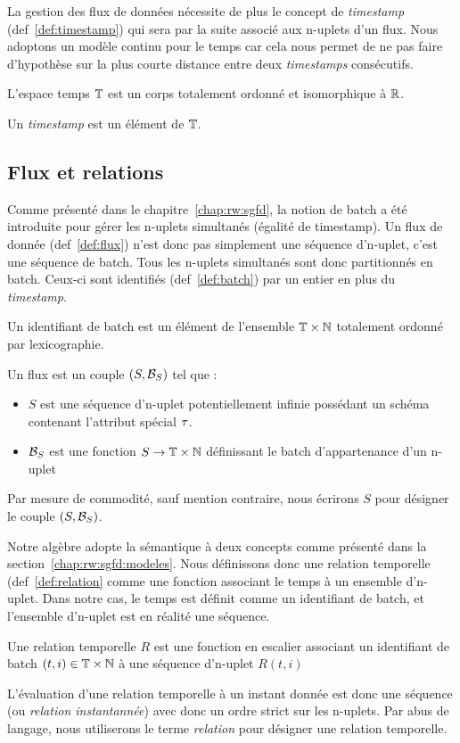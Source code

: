 La gestion des flux de données nécessite de plus le concept de \textit{timestamp} (def~\ref{def:timestamp}) qui sera par la suite associé aux n-uplets d'un flux. Nous adoptons un modèle continu pour le temps car cela nous permet de ne pas faire d'hypothèse sur la plus courte distance entre deux \textit{timestamps} consécutifs.
\begin{defi}[Timestamp]\label{def:timestamp}
    L'espace temps $\mathbb{T}$ est un corps totalement ordonné et isomorphique à $\mathbb{R}$. 

    Un \textit{timestamp} est un élément de $\mathbb{T}$.
\end{defi}

\subsection{Flux et relations}
Comme présenté dans le chapitre~\ref{chap:rw:sgfd}, la notion de batch a été introduite pour gérer les n-uplets simultanés (égalité de timestamp). Un flux de donnée (def~\ref{def:flux}) n'est donc pas simplement une séquence d'n-uplet, c'est une séquence de batch. Tous les n-uplets simultanés  sont donc partitionnés en batch. Ceux-ci sont identifiés (def~\ref{def:batch}) par un entier en plus du \textit{timestamp}.
\begin{defi}\label{def:batch}
    Un identifiant de batch est un élément de l'ensemble $\mathbb{T}\times\mathbb{N}$ totalement ordonné par lexicographie.
\end{defi}
\begin{defi}[Flux]\label{def:flux}
    Un flux est un couple $(S,\mathcal{B}_S)$ tel que :
    \begin{itemize}
        \item $S$ est une séquence d'n-uplet potentiellement infinie possédant un schéma contenant l'attribut spécial $\tau$.
        \item $\mathcal{B}_S$ est une fonction $S\to \mathbb{T}\times\mathbb{N}$ définissant le batch d'appartenance d'un n-uplet
    \end{itemize}
    
    Par mesure de commodité, sauf mention contraire, nous écrirons $S$ pour désigner le couple $(S,\mathcal{B}_S)$.
\end{defi}

Notre algèbre adopte la sémantique à deux concepts comme présenté dans la section~\ref{chap:rw:sgfd:modeles}. Nous définissons donc une relation temporelle (def~\ref{def:relation} comme une fonction associant le temps à un ensemble d'n-uplet. Dans notre cas, le temps est définit comme un identifiant de batch, et l'ensemble d'n-uplet est en réalité une séquence. 
\begin{defi}\label{def:relation}
	Une relation temporelle $R$ est une fonction en escalier associant un identifiant de batch $(t,i)\in\mathbb{T}\times\mathbb{N}$ à une séquence d'n-uplet $R(t,i)$
\end{defi}
L'évaluation d'une relation temporelle à un instant donnée est donc une séquence (ou \textit{relation instantannée}) avec donc un ordre strict sur les n-uplets. Par abus de langage, nous utiliserons le terme \textit{relation} pour désigner une relation temporelle.

